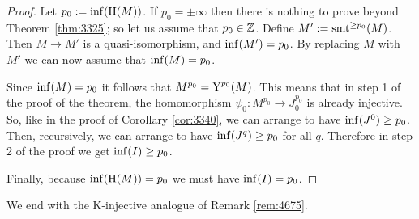 \begin{proof}
Let $p_0 := \operatorname{inf}(\operatorname{H}(M))$. If $p_0 = \pm \infty$ then there is 
nothing to prove beyond Theorem \ref{thm:3325}; so let us assume 
that $p_0 \in \mathbb{Z}$. 
Define $M' := \operatorname{smt}^{\geq p_0}(M)$. Then $M \to M'$ is a quasi-isomorphism, 
and $\operatorname{inf}(M') = p_0$. By replacing $M$ with $M'$ we can now assume that 
$\operatorname{inf}(M) = p_0$.

Since $\operatorname{inf}(M) = p_0$ it follows that 
$M^{p_0} = \operatorname{Y}^{p_0}(M)$. This means that in step 1 of the proof of the 
theorem, the homomorphism 
$\psi_0 : M^{p_0} \to J^{p_0}_0$ is already injective. So, like in the proof of 
Corollary \ref{cor:3340}, we can arrange to have 
$\operatorname{inf}(J^0) \geq p_0$. Then, recursively, we can arrange to 
have $\operatorname{inf}(J^q) \geq p_0$ for all $q$. Therefore in step 2 of the proof we 
get $\operatorname{inf}(I) \geq p_0$. 

Finally, because $\operatorname{inf}(\operatorname{H}(M)) = p_0$ we must have 
$\operatorname{inf}(I) = p_0$.
\end{proof}

We end with the K-injective analogue of Remark \ref{rem:4675}.

